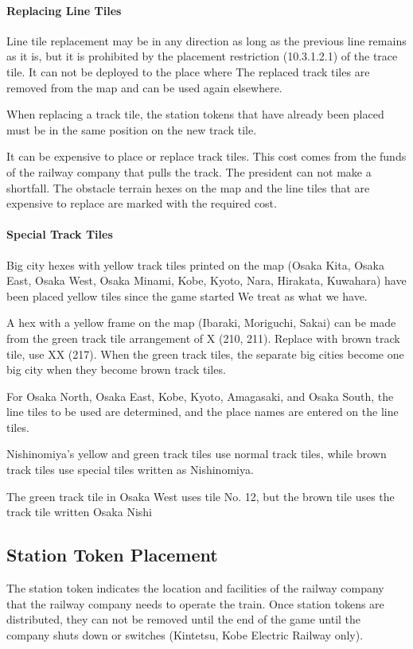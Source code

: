 \documentclass{article}
\begin{document}
\begin{CJK}{UTF8}{min}
\paragraph{Replacing Line Tiles}
Line tile replacement may be in any direction as long as the previous
line remains as it is, but it is prohibited by the placement
restriction (10.3.1.2.1) of the trace tile. It can not be deployed to
the place where The replaced track tiles are removed from the map and
can be used again elsewhere.

When replacing a track tile, the station tokens that have already been
placed must be in the same position on the new track tile.

It can be expensive to place or replace track tiles. This cost comes
from the funds of the railway company that pulls the track. The
president can not make a shortfall. The obstacle terrain hexes on the
map and the line tiles that are expensive to replace are marked with
the required cost.

\paragraph{Special Track Tiles}
Big city hexes with yellow track tiles printed on the map (Osaka Kita,
Osaka East, Osaka West, Osaka Minami, Kobe, Kyoto, Nara, Hirakata,
Kuwahara) have been placed yellow tiles since the game started We
treat as what we have.

A hex with a yellow frame on the map (Ibaraki, Moriguchi, Sakai) can
be made from the green track tile arrangement of X (210, 211). Replace
with brown track tile, use XX (217). When the green track tiles, the
separate big cities become one big city when they become brown track
tiles.

For Osaka North, Osaka East, Kobe, Kyoto, Amagasaki, and Osaka South,
the line tiles to be used are determined, and the place names are
entered on the line tiles.

Nishinomiya's yellow and green track tiles use normal track tiles,
while brown track tiles use special tiles written as Nishinomiya.

The green track tile in Osaka West uses tile No. 12, but the brown
tile uses the track tile written Osaka Nishi

\subsection{Station Token Placement}
The station token indicates the location and facilities of the railway
company that the railway company needs to operate the train. Once
station tokens are distributed, they can not be removed until the end
of the game until the company shuts down or switches (Kintetsu, Kobe
Electric Railway only).


\end{CJK}
\end{document}
